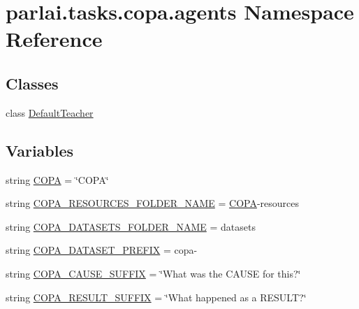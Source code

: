 \hypertarget{namespaceparlai_1_1tasks_1_1copa_1_1agents}{}\section{parlai.\+tasks.\+copa.\+agents Namespace Reference}
\label{namespaceparlai_1_1tasks_1_1copa_1_1agents}
\subsection*{Classes}
\begin{DoxyCompactItemize}
\item 
class \hyperlink{classparlai_1_1tasks_1_1copa_1_1agents_1_1DefaultTeacher}{Default\+Teacher}
\end{DoxyCompactItemize}
\subsection*{Variables}
\begin{DoxyCompactItemize}
\item 
string \hyperlink{namespaceparlai_1_1tasks_1_1copa_1_1agents_a829704a18561f4fc006f3ef716f90242}{C\+O\+PA} = \char`\"{}C\+O\+PA\char`\"{}
\item 
string \hyperlink{namespaceparlai_1_1tasks_1_1copa_1_1agents_a8f49054dedd8264dfc0db5be5a8a1546}{C\+O\+P\+A\+\_\+\+R\+E\+S\+O\+U\+R\+C\+E\+S\+\_\+\+F\+O\+L\+D\+E\+R\+\_\+\+N\+A\+ME} = \textquotesingle{}\hyperlink{namespaceparlai_1_1tasks_1_1copa_1_1agents_a829704a18561f4fc006f3ef716f90242}{C\+O\+PA}-\/resources\textquotesingle{}
\item 
string \hyperlink{namespaceparlai_1_1tasks_1_1copa_1_1agents_a4a852952558b310fc1d922bd680fc199}{C\+O\+P\+A\+\_\+\+D\+A\+T\+A\+S\+E\+T\+S\+\_\+\+F\+O\+L\+D\+E\+R\+\_\+\+N\+A\+ME} = \textquotesingle{}datasets\textquotesingle{}
\item 
string \hyperlink{namespaceparlai_1_1tasks_1_1copa_1_1agents_a348882911524d4f863f4e1383900fca7}{C\+O\+P\+A\+\_\+\+D\+A\+T\+A\+S\+E\+T\+\_\+\+P\+R\+E\+F\+IX} = \textquotesingle{}copa-\/\textquotesingle{}
\item 
string \hyperlink{namespaceparlai_1_1tasks_1_1copa_1_1agents_a91c4624ef582213946868b644dcfd8d1}{C\+O\+P\+A\+\_\+\+C\+A\+U\+S\+E\+\_\+\+S\+U\+F\+F\+IX} = \char`\"{}What was the C\+A\+U\+SE for this?\char`\"{}
\item 
string \hyperlink{namespaceparlai_1_1tasks_1_1copa_1_1agents_a89226c185edfd8a6ae2186a4b1593857}{C\+O\+P\+A\+\_\+\+R\+E\+S\+U\+L\+T\+\_\+\+S\+U\+F\+F\+IX} = \char`\"{}What happened as a R\+E\+S\+U\+LT?\char`\"{}
\end{DoxyCompactItemize}


